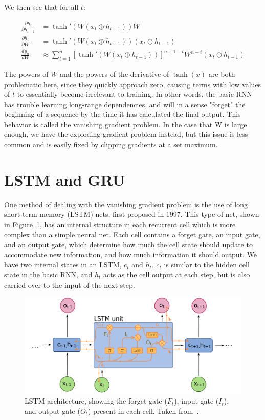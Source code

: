 We then see that for all $t$:

\begin{align}
    \frac{\partial h_t}{\partial h_{t-1}} &= \tanh'(W(x_t\oplus h_{t-1}))W \\
    \frac{\partial h_t}{\partial W} &= \tanh'(W(x_t\oplus h_{t-1}))(x_t\oplus h_{t-1}) \\
    \frac{dy_n}{dW} &\approx \sum_{t=1}^{n} [\tanh'(W(x_t\oplus h_{t-1}))]^{n+1-t}W^{n-t}(x_t\oplus h_{t-1})
\end{align}

The powers of $W$ and the powers of the derivative of $\tanh(x)$ are both problematic here, since they quickly approach zero, causing terms with low values of $t$ to essentially become irrelevant to training. In other words, the basic RNN has trouble learning long-range dependencies, and will in a sense "forget" the beginning of a sequence by the time it has calculated the final output. This behavior is called the vanishing gradient problem. In the case that W is large enough, we have the exploding gradient problem instead, but this issue is less common and is easily fixed by clipping gradients at a set maximum.

\section{LSTM and GRU}

One method of dealing with the vanishing gradient problem is the use of long short-term memory (LSTM) nets, first proposed in 1997. This type of net, shown in Figure~\ref{fig:LSTM_diagram}, has an internal structure in each recurrent cell which is more complex than a simple neural net. Each cell contains a forget gate, an input gate, and an output gate, which determine how much the cell state should update to accommodate new information, and how much information it should output. We have two internal states in an LSTM, $c_t$ and $h_t$. $c_t$ is similar to the hidden cell state in the basic RNN, and $h_t$ acts as the cell output at each step, but is also carried over to the input of the next step.

\begin{figure}[htbp]
    \centering
    \includegraphics[width=\linewidth]{Images/ML/LSTM.png}
    \caption{LSTM architecture, showing the forget gate ($F_t$), input gate ($I_t$), and output gate ($O_t$) present in each cell. Taken from~\cite{LSTMDiagram}.}
    \label{fig:LSTM_diagram}
\end{figure}

